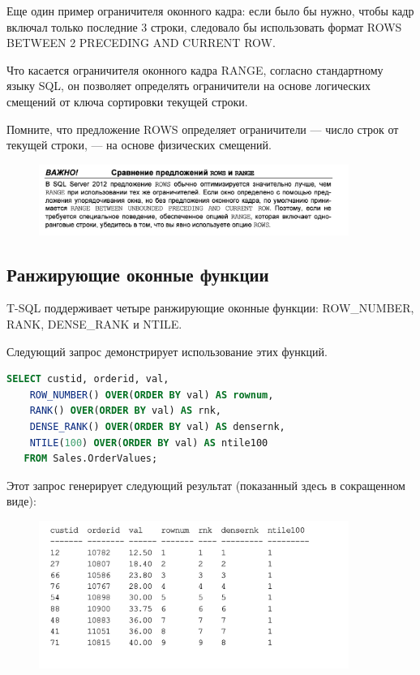 Еще один пример ограничителя оконного кадра: если было бы нужно, чтобы кадр
включал только последние 3 строки, следовало бы использовать формат ROWS
BETWEEN 2 PRECEDING AND CURRENT ROW. 

Что касается ограничителя оконного кадра RANGE, согласно стандартному языку
SQL, он позволяет определять ограничители на основе логических смещений от
ключа сортировки текущей строки. 

Помните, что предложение ROWS определяет  ограничители — число строк от текущей строки, — на основе физических смещений.


\begin{figure}[h!]
	\begin{center}
		\includegraphics[width=0.9\textwidth]{img/warn2.png}
	\end{center}
	\captionsetup{justification=centering}
\end{figure}


\subsection{Ранжирующие оконные функции}

T-SQL поддерживает четыре ранжирующие оконные
функции: ROW\_NUMBER, RANK, DENSE\_RANK и NTILE.

Следующий запрос демонстрирует использование этих функций. 

\begin{lstlisting}[label=lst:funcReturn, language=sql]
	SELECT custid, orderid, val,
	ROW_NUMBER() OVER(ORDER BY val) AS rownum,
	RANK() OVER(ORDER BY val) AS rnk,
	DENSE_RANK() OVER(ORDER BY val) AS densernk,
	NTILE(100) OVER(ORDER BY val) AS ntile100
   FROM Sales.OrderValues; 
\end{lstlisting}
	
Этот запрос генерирует следующий результат (показанный здесь в сокращенном
виде): 

\begin{figure}[h!]
	\begin{center}
		\includegraphics[width=0.9\textwidth]{img/res15.png}
	\end{center}
	\captionsetup{justification=centering}
\end{figure}


